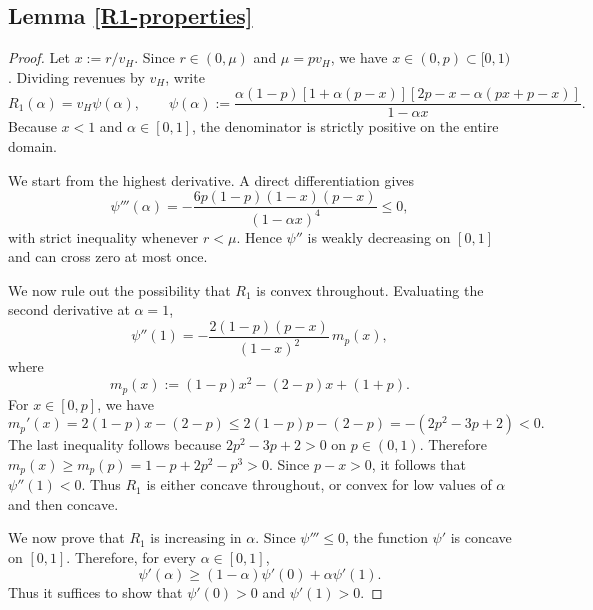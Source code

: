 \subsection*{Lemma \ref{R1-properties}}

\begin{proof}
    Let $x := r/v_H$. Since $r \in (0,\mu)$ and $\mu = p v_H$, we have $x \in (0,p) \subset [0,1)$. Dividing revenues by $v_H$, write
\begin{equation*}
    R_1(\alpha) = v_H \psi(\alpha), \qquad \psi(\alpha) := \frac{\alpha (1-p) [1+\alpha (p-x)] [2p-x-\alpha (px+p-x)]}{1-\alpha x}.
\end{equation*}
Because $x<1$ and $\alpha \in [0,1]$, the denominator is strictly positive on the entire domain.

\noindent We start from the highest derivative. A direct differentiation gives
\begin{equation*}
    \psi'''(\alpha) = - \frac{6p(1-p)(1-x)(p-x)}{(1-\alpha x)^4} \leq 0,
\end{equation*}
with strict inequality whenever $r<\mu$. Hence $\psi''$ is weakly decreasing on $[0,1]$ and can cross zero at most once.

\noindent We now rule out the possibility that $R_1$ is convex throughout. Evaluating the second derivative at $\alpha=1$,
\begin{equation*}
    \psi''(1) = - \frac{2(1-p)(p-x)}{(1-x)^2} \, m_p(x),
\end{equation*}
where
\begin{equation*}
    m_p(x) := (1-p)x^2 - (2-p)x + (1+p).
\end{equation*}
For $x \in [0,p]$, we have
\begin{equation*}
    m_p'(x) = 2(1-p)x - (2-p) \leq 2(1-p)p - (2-p) = -\left(2p^2-3p+2\right)<0.
\end{equation*}
The last inequality follows because $2p^2-3p+2>0$ on $p \in (0,1)$.
Therefore $m_p(x) \geq m_p(p) = 1-p+2p^2-p^3>0$. Since $p-x>0$, it follows that $\psi''(1)<0$. Thus $R_1$ is either concave throughout, or convex for low values of $\alpha$ and then concave.

\noindent We now prove that $R_1$ is increasing in $\alpha$. Since $\psi''' \leq 0$, the function $\psi'$ is concave on $[0,1]$. Therefore, for every $\alpha \in [0,1]$,
\begin{equation*}
    \psi'(\alpha) \geq (1-\alpha)\psi'(0) + \alpha \psi'(1).
\end{equation*}
Thus it suffices to show that $\psi'(0)>0$ and $\psi'(1)>0$.


\end{proof}
